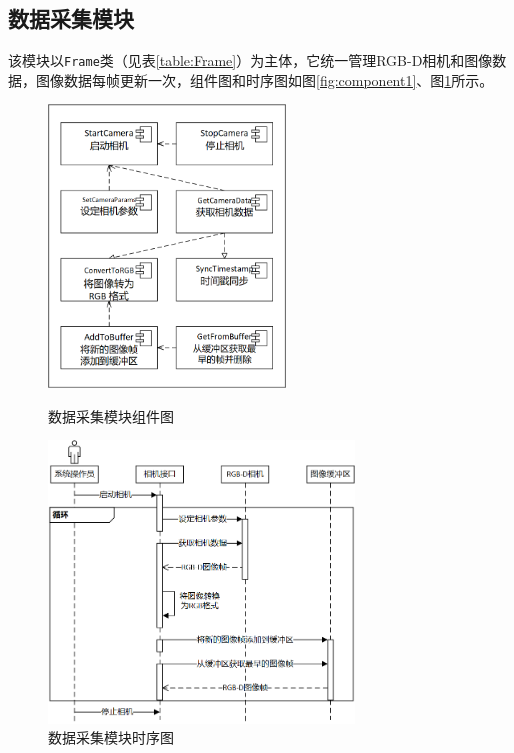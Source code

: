 \subsection{数据采集模块}
\par 该模块以\texttt{Frame}类（见表\ref{table:Frame}）为主体，它统一管理RGB-D相机和图像数据，图像数据每帧更新一次，组件图和时序图如图\ref{fig:component1}、图\ref{fig:sequence1}所示。


\begin{figure}[htb]
	\centering
	\begin{minipage}[t]{0.44\textwidth}
		\centering
		\includegraphics[height=7.5cm,keepaspectratio]{figures/uml/component1.png}
		\caption{数据采集模块组件图}
		\label{fig:component1}
	\end{minipage}
	\begin{minipage}[t]{0.51\textwidth}
		\centering
		\includegraphics[height=7.5cm,keepaspectratio]{figures/uml/sequence1.png}
		\caption{数据采集模块时序图}
		\label{fig:sequence1}
	\end{minipage}
\end{figure}

